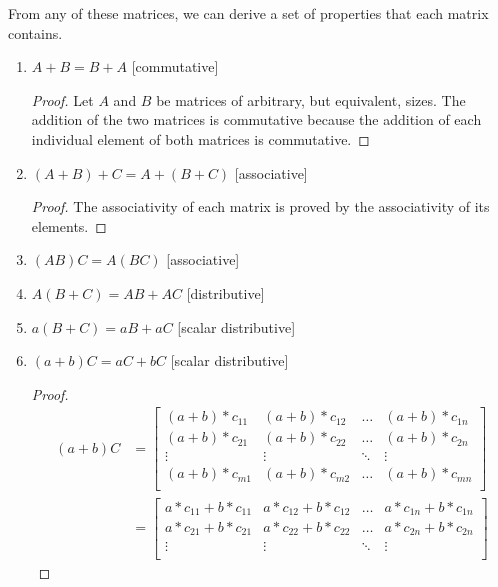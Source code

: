 From any of these matrices, we can derive a set of properties that each matrix
contains.
\begin{enumerate}
    \item $A+B=B+A$ [commutative]
        \begin{proof}
            Let $A$ and $B$ be matrices of arbitrary, but equivalent, sizes. The
            addition of the two matrices is commutative because the addition of
            each individual element of both matrices is commutative.
        \end{proof}
    \item $(A+B)+C=A+(B+C)$ [associative]
        \begin{proof}
            The associativity of each matrix is proved by the associativity of
            its elements.
        \end{proof}
    \item $(AB)C=A(BC)$ [associative]
    \item $A(B+C)=AB+AC$ [distributive]
    \item $a(B+C)=aB+aC$ [scalar distributive]
    \item $(a+b)C=aC+bC$ [scalar distributive]
        \begin{proof}
            \begin{align*}
                (a+b)C &=
                \begin{bmatrix}
                    (a+b)*c_{11} & (a+b)*c_{12} & \ldots & (a+b)*c_{1n} \\
                    (a+b)*c_{21} & (a+b)*c_{22} & \ldots & (a+b)*c_{2n} \\
                    \vdots & \vdots & \ddots & \vdots \\
                    (a+b)*c_{m1} & (a+b)*c_{m2} & \ldots & (a+b)*c_{mn} \\
                \end{bmatrix} \\
                &=
                \begin{bmatrix}
                    a*c_{11}+b*c_{11}
                    & a*c_{12}+b*c_{12}
                    & \ldots
                    & a*c_{1n}+b*c_{1n} \\
                    a*c_{21}+b*c_{21}
                    & a*c_{22}+b*c_{22}
                    & \ldots
                    & a*c_{2n}+b*c_{2n} \\
                    \vdots & \vdots & \ddots & \vdots \\

\end{bmatrix}
\end{align*}
\end{proof}
\end{enumerate}
